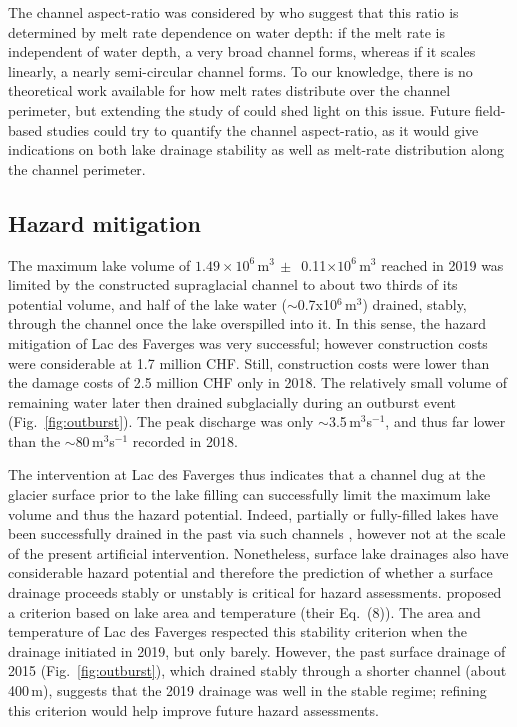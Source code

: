 The channel aspect-ratio was considered by \cite{Jarosch&Gudmundsson2012} who suggest that this ratio is determined by melt rate dependence on water depth: if the melt rate is independent of water depth, a very broad channel forms, whereas if it scales linearly, a nearly semi-circular channel forms. To our knowledge, there is no theoretical work available for how melt rates distribute over the channel perimeter, but extending the study of \cite{Sommers&Rajaram2020} could shed light on this issue. Future field-based studies could try to quantify the channel aspect-ratio, as it would give indications on both lake drainage stability as well as melt-rate distribution along the channel perimeter.


 \subsection{Hazard mitigation}

The maximum lake volume of $1.49\times10^6$\,m$^3\,\pm\,$ 0.11$\times10^6$\,m$^3$ reached in 2019 was limited by the constructed supraglacial channel to about two thirds of its potential volume, and half of the lake water ($\sim$0.7x10$^6$\,m$^3$) drained, stably, through the channel once the lake overspilled into it. In this sense, the hazard mitigation of Lac des Faverges was very successful; however construction costs were considerable at 1.7 million CHF. Still, construction costs were lower than the damage costs of 2.5 million CHF only in 2018.
The relatively small volume of remaining water later then drained subglacially during an outburst event (Fig.~\ref{fig:outburst}). The peak discharge was only $\sim$3.5\,m$^3$s$^{-1}$, and thus far lower than the $\sim$80\,m$^3$s$^{-1}$ recorded in 2018.

The intervention at Lac des Faverges thus indicates that a channel dug at the glacier surface prior to the lake filling can successfully limit the maximum lake volume and thus the hazard potential.  Indeed, partially or fully-filled lakes have been successfully drained in the past via such channels \citep[e.g.][]{Vincent&al2010}, however not at the scale of the present artificial intervention. Nonetheless, surface lake drainages also have considerable hazard potential \citep[e.g.][]{Ancey&al2019, Walder&Costa1996} and therefore the prediction of whether a surface drainage proceeds stably or unstably is critical for hazard assessments. \cite{Raymond&Nolan2000}
proposed a criterion based on lake area and temperature (their Eq.~(8)). The area and temperature of Lac des Faverges respected this stability criterion when the drainage initiated in 2019, but only barely.  However, the past surface drainage of 2015 (Fig.~\ref{fig:outburst}), which drained stably through a shorter channel (about 400\,m), suggests that the 2019 drainage was well in the stable regime; refining this criterion would help improve future hazard assessments.

